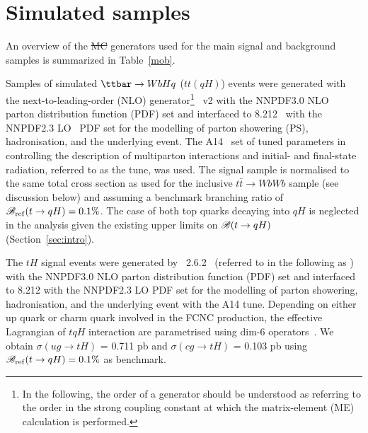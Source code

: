 \documentclass[PAPER, coverpage, atlasdraft=true, texlive=2016, UKenglish]{\ATLASLATEXPATH atlasdoc}
\providecommand{\DIFadd}[1]{{\protect\color{blue}\uwave{#1}}} %
\providecommand{\DIFdel}[1]{{\protect\color{red}\sout{#1}}}                      %
\providecommand{\DIFaddbegin}{} %
\providecommand{\DIFaddend}{} %
\providecommand{\DIFdelbegin}{} %
\providecommand{\DIFdelend}{} %
\begin{document}
%
\section{Simulated samples}
\label{sec:simulations}

An overview of the \DIFdelbegin \DIFdel{MC }\DIFdelend \DIFaddbegin \DIFadd{Monte Carlo (MC) }\DIFaddend generators used for the main signal and background samples is summarized in Table~\ref{mob}.
\DIFdelbegin %

\DIFdelend Samples of simulated $\ttbar \to WbHq$ ($tt(qH)$) events were generated with the next-to-leading-order (NLO) generator\footnote{In the following, 
the order of a generator should be understood as referring to the order in the strong coupling constant at which the matrix-element (ME) calculation 
is performed.} {\powheg}~v2 \cite{Frixione:2007nw,Nason:2004rx,Frixione:2007vw,Alioli:2010xd}
with the NNPDF3.0 NLO~\cite{Ball:2014uwa} parton distribution function (PDF) set and interfaced to {\pythia} 8.212~\cite{Sjostrand:2007gs} with the NNPDF2.3 LO~\cite{Ball:2012cx} PDF set for the modelling of parton showering (PS), hadronisation, and the underlying event. 
The A14~\cite{ATLASUETune4} set of tuned parameters in {\pythia} controlling the description of multiparton interactions and  
initial- and final-state radiation, referred to as the tune, was used.
The signal sample is normalised to the same total cross section as used for the inclusive $t\bar{t}\to WbWb$ sample (see discussion below) and
assuming a benchmark branching ratio of $\mathscr{B}_{\mathrm{ref}}(t\to qH)=0.1\%$.
The case of both top quarks decaying into $qH$ is neglected in the analysis given the existing upper limits on $\mathscr{B}(t \to qH)$ (Section~\ref{sec:intro}).

The $tH$ signal events were generated by {\amcatnlolong}~2.6.2~\cite{Alwall:2014hca}  (referred to in the following as {\amcatnlo})
with the NNPDF3.0 NLO parton distribution function (PDF) set and interfaced to {\pythia} 8.212 with the NNPDF2.3 LO PDF set for the modelling of parton showering,
hadronisation, and the underlying event with the A14 tune.
Depending on either up quark or charm quark involved in the FCNC production, the effective Lagrangian of $tqH$ interaction are parametrised using
dim-6 operators~\cite{fcnc_production_theory}. We obtain $\sigma(ug\to tH)$ = 0.711 pb and $\sigma(cg\to tH)$ = 0.103 pb using $\mathscr{B}_{\mathrm{ref}}(t\to qH)=0.1\%$ as benchmark.   
\end{document}
